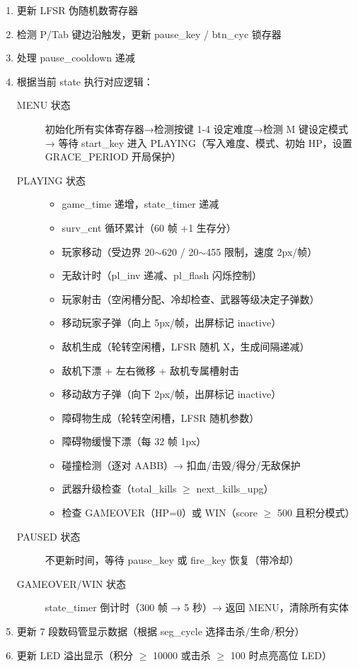 \documentclass[12pt,a4paper]{ctexart}
\begin{document}
\begin{enumerate}[label=(\arabic*)]
    \item 更新 LFSR 伪随机数寄存器
    \item 检测 P/Tab 键边沿触发，更新 pause\_key / btn\_cyc 锁存器
    \item 处理 pause\_cooldown 递减
    \item 根据当前 state 执行对应逻辑：
    \begin{description}
        \item[MENU 状态] 初始化所有实体寄存器→检测按键 1-4 设定难度→检测 M 键设定模式→
        等待 start\_key 进入 PLAYING（写入难度、模式、初始 HP，设置 GRACE\_PERIOD 开局保护）
        \item[PLAYING 状态]\mbox{}
        \begin{itemize}
            \item game\_time 递增，state\_timer 递减
            \item surv\_cnt 循环累计（60 帧 +1 生存分）
            \item 玩家移动（受边界 20$\sim$620 / 20$\sim$455 限制，速度 2px/帧）
            \item 无敌计时（pl\_inv 递减、pl\_flash 闪烁控制）
            \item 玩家射击（空闲槽分配、冷却检查、武器等级决定子弹数）
            \item 移动玩家子弹（向上 5px/帧，出屏标记 inactive）
            \item 敌机生成（轮转空闲槽，LFSR 随机 X，生成间隔递减）
            \item 敌机下漂 + 左右微移 + 敌机专属槽射击
            \item 移动敌方子弹（向下 2px/帧，出屏标记 inactive）
            \item 障碍物生成（轮转空闲槽，LFSR 随机参数）
            \item 障碍物缓慢下漂（每 32 帧 1px）
            \item 碰撞检测（逐对 AABB）→ 扣血/击毁/得分/无敌保护
            \item 武器升级检查（total\_kills $\ge$ next\_kills\_upg）
            \item 检查 GAMEOVER（HP=0）或 WIN（score $\ge$ 500 且积分模式）
        \end{itemize}
        \item[PAUSED 状态] 不更新时间，等待 pause\_key 或 fire\_key 恢复（带冷却）
        \item[GAMEOVER/WIN 状态] state\_timer 倒计时（300 帧 → 5 秒）→ 返回 MENU，清除所有实体
    \end{description}
    \item 更新 7 段数码管显示数据（根据 seg\_cycle 选择击杀/生命/积分）
    \item 更新 LED 溢出显示（积分 $\ge$ 10000 或击杀 $\ge$ 100 时点亮高位 LED）
\end{enumerate}
\end{document}
